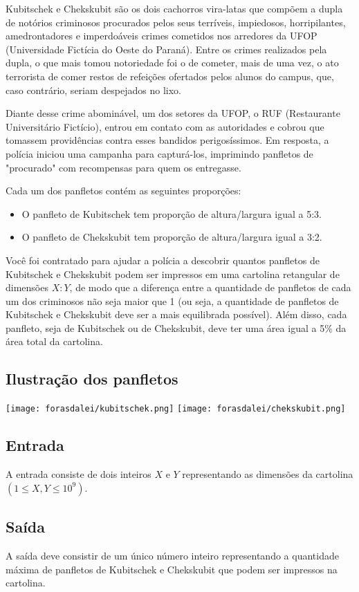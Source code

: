 \documentclass{article}
\begin{document}
Kubitschek e Chekskubit são os dois cachorros vira-latas que compõem a dupla de notórios criminosos procurados pelos seus terríveis, impiedosos, horripilantes, amedrontadores e imperdoáveis crimes cometidos nos arredores da UFOP (Universidade Fictícia do Oeste do Paraná). Entre os crimes realizados pela dupla, o que mais tomou notoriedade foi o de cometer, mais de uma vez, o ato terrorista de comer restos de refeições ofertados pelos alunos do campus, que, caso contrário, seriam despejados no lixo.

Diante desse crime abominável, um dos setores da UFOP, o RUF (Restaurante Universitário Fictício), entrou em contato com as autoridades e cobrou que tomassem providências contra esses bandidos perigosíssimos. Em resposta, a polícia iniciou uma campanha para capturá-los, imprimindo panfletos de "procurado" com recompensas para quem os entregasse.

Cada um dos panfletos contém as seguintes proporções:
\begin{itemize}
    \item O panfleto de Kubitschek tem proporção de altura/largura igual a 5:3.
    \item O panfleto de Chekskubit tem proporção de altura/largura igual a 3:2.
\end{itemize}

Você foi contratado para ajudar a polícia a descobrir quantos panfletos de Kubitschek e Chekskubit podem ser impressos em uma cartolina retangular de dimensões $X:Y$, de modo que a diferença entre a quantidade de panfletos de cada um dos criminosos não seja maior que 1 (ou seja, a quantidade de panfletos de Kubitschek e Chekskubit deve ser a mais equilibrada possível). Além disso, cada panfleto, seja de Kubitschek ou de Chekskubit, deve ter uma área igual a 5\% da área total da cartolina.

\subsection*{Ilustração dos panfletos}

\begin{center}
    \texttt{[image: forasdalei/kubitschek.png]}
    \hspace{1cm}
    \texttt{[image: forasdalei/chekskubit.png]}
\end{center}

\subsection*{Entrada}
A entrada consiste de dois inteiros $X$ e $Y$ representando as dimensões da cartolina $(1 \leq X, Y \leq 10^9)$.

\subsection*{Saída}
A saída deve consistir de um único número inteiro representando a quantidade máxima de panfletos de Kubitschek e Chekskubit que podem ser impressos na cartolina.
\end{document}
